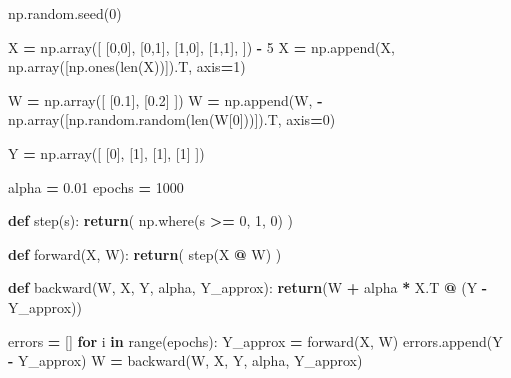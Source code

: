 \documentclass[
]{book}
\newenvironment{Shaded}{\begin{snugshade}}{\end{snugshade}}
\newcommand{\BuiltInTok}[1]{#1}
\newcommand{\ControlFlowTok}[1]{\textcolor[rgb]{0.13,0.29,0.53}{\textbf{#1}}}
\newcommand{\DecValTok}[1]{\textcolor[rgb]{0.00,0.00,0.81}{#1}}
\newcommand{\FloatTok}[1]{\textcolor[rgb]{0.00,0.00,0.81}{#1}}
\newcommand{\KeywordTok}[1]{\textcolor[rgb]{0.13,0.29,0.53}{\textbf{#1}}}
\newcommand{\NormalTok}[1]{#1}
\newcommand{\OperatorTok}[1]{\textcolor[rgb]{0.81,0.36,0.00}{\textbf{#1}}}
\begin{document}
\begin{Shaded}
\begin{Highlighting}[]
\NormalTok{np.random.seed(}\DecValTok{0}\NormalTok{)}

\NormalTok{X }\OperatorTok{=}\NormalTok{ np.array([}
\NormalTok{  [}\DecValTok{0}\NormalTok{,}\DecValTok{0}\NormalTok{],}
\NormalTok{  [}\DecValTok{0}\NormalTok{,}\DecValTok{1}\NormalTok{],}
\NormalTok{  [}\DecValTok{1}\NormalTok{,}\DecValTok{0}\NormalTok{],}
\NormalTok{  [}\DecValTok{1}\NormalTok{,}\DecValTok{1}\NormalTok{],}
\NormalTok{]) }\OperatorTok{{-}} \DecValTok{5}
\NormalTok{X }\OperatorTok{=}\NormalTok{ np.append(X, np.array([np.ones(}\BuiltInTok{len}\NormalTok{(X))]).T, axis}\OperatorTok{=}\DecValTok{1}\NormalTok{)}

\NormalTok{W }\OperatorTok{=}\NormalTok{ np.array([}
\NormalTok{  [}\FloatTok{0.1}\NormalTok{], }
\NormalTok{  [}\FloatTok{0.2}\NormalTok{]}
\NormalTok{])}
\NormalTok{W }\OperatorTok{=}\NormalTok{ np.append(W, }\OperatorTok{{-}}\NormalTok{np.array([np.random.random(}\BuiltInTok{len}\NormalTok{(W[}\DecValTok{0}\NormalTok{]))]).T, axis}\OperatorTok{=}\DecValTok{0}\NormalTok{)}

\NormalTok{Y }\OperatorTok{=}\NormalTok{ np.array([}
\NormalTok{  [}\DecValTok{0}\NormalTok{],}
\NormalTok{  [}\DecValTok{1}\NormalTok{],}
\NormalTok{  [}\DecValTok{1}\NormalTok{],}
\NormalTok{  [}\DecValTok{1}\NormalTok{]}
\NormalTok{])}

\NormalTok{alpha }\OperatorTok{=} \FloatTok{0.01}
\NormalTok{epochs }\OperatorTok{=} \DecValTok{1000}

\KeywordTok{def}\NormalTok{ step(s):}
  \ControlFlowTok{return}\NormalTok{( np.where(s }\OperatorTok{\textgreater{}=} \DecValTok{0}\NormalTok{, }\DecValTok{1}\NormalTok{, }\DecValTok{0}\NormalTok{) )}


\KeywordTok{def}\NormalTok{ forward(X, W):}
  \ControlFlowTok{return}\NormalTok{( step(X }\OperatorTok{@}\NormalTok{ W) )}

\KeywordTok{def}\NormalTok{ backward(W, X, Y, alpha, Y\_approx):}
    \ControlFlowTok{return}\NormalTok{(W }\OperatorTok{+}\NormalTok{ alpha }\OperatorTok{*}\NormalTok{ X.T }\OperatorTok{@}\NormalTok{ (Y }\OperatorTok{{-}}\NormalTok{ Y\_approx))}
  
  
\NormalTok{errors }\OperatorTok{=}\NormalTok{ []}
\ControlFlowTok{for}\NormalTok{ i }\KeywordTok{in} \BuiltInTok{range}\NormalTok{(epochs):}
\NormalTok{  Y\_approx }\OperatorTok{=}\NormalTok{ forward(X, W)}
\NormalTok{  errors.append(Y }\OperatorTok{{-}}\NormalTok{ Y\_approx)}
\NormalTok{  W }\OperatorTok{=}\NormalTok{ backward(W, X, Y, alpha, Y\_approx)}
  

\end{Highlighting}
\end{Shaded}
\end{document}
